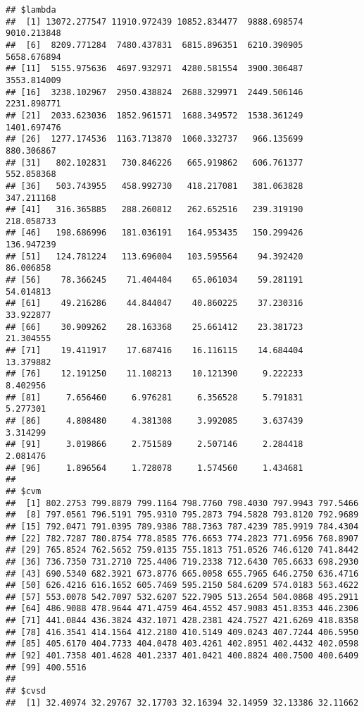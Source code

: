 \documentclass[]{article}
\begin{document}
\begin{verbatim}
## $lambda
##  [1] 13072.277547 11910.972439 10852.834477  9888.698574  9010.213848
##  [6]  8209.771284  7480.437831  6815.896351  6210.390905  5658.676894
## [11]  5155.975636  4697.932971  4280.581554  3900.306487  3553.814009
## [16]  3238.102967  2950.438824  2688.329971  2449.506146  2231.898771
## [21]  2033.623036  1852.961571  1688.349572  1538.361249  1401.697476
## [26]  1277.174536  1163.713870  1060.332737   966.135699   880.306867
## [31]   802.102831   730.846226   665.919862   606.761377   552.858368
## [36]   503.743955   458.992730   418.217081   381.063828   347.211168
## [41]   316.365885   288.260812   262.652516   239.319190   218.058733
## [46]   198.686996   181.036191   164.953435   150.299426   136.947239
## [51]   124.781224   113.696004   103.595564    94.392420    86.006858
## [56]    78.366245    71.404404    65.061034    59.281191    54.014813
## [61]    49.216286    44.844047    40.860225    37.230316    33.922877
## [66]    30.909262    28.163368    25.661412    23.381723    21.304555
## [71]    19.411917    17.687416    16.116115    14.684404    13.379882
## [76]    12.191250    11.108213    10.121390     9.222233     8.402956
## [81]     7.656460     6.976281     6.356528     5.791831     5.277301
## [86]     4.808480     4.381308     3.992085     3.637439     3.314299
## [91]     3.019866     2.751589     2.507146     2.284418     2.081476
## [96]     1.896564     1.728078     1.574560     1.434681
## 
## $cvm
##  [1] 802.2753 799.8879 799.1164 798.7760 798.4030 797.9943 797.5466
##  [8] 797.0561 796.5191 795.9310 795.2873 794.5828 793.8120 792.9689
## [15] 792.0471 791.0395 789.9386 788.7363 787.4239 785.9919 784.4304
## [22] 782.7287 780.8754 778.8585 776.6653 774.2823 771.6956 768.8907
## [29] 765.8524 762.5652 759.0135 755.1813 751.0526 746.6120 741.8442
## [36] 736.7350 731.2710 725.4406 719.2338 712.6430 705.6633 698.2930
## [43] 690.5340 682.3921 673.8776 665.0058 655.7965 646.2750 636.4716
## [50] 626.4216 616.1652 605.7469 595.2150 584.6209 574.0183 563.4622
## [57] 553.0078 542.7097 532.6207 522.7905 513.2654 504.0868 495.2911
## [64] 486.9088 478.9644 471.4759 464.4552 457.9083 451.8353 446.2306
## [71] 441.0844 436.3824 432.1071 428.2381 424.7527 421.6269 418.8358
## [78] 416.3541 414.1564 412.2180 410.5149 409.0243 407.7244 406.5950
## [85] 405.6170 404.7733 404.0478 403.4261 402.8951 402.4432 402.0598
## [92] 401.7358 401.4628 401.2337 401.0421 400.8824 400.7500 400.6409
## [99] 400.5516
## 
## $cvsd
##  [1] 32.40974 32.29767 32.17703 32.16394 32.14959 32.13386 32.11662

\end{verbatim}
\end{document}

